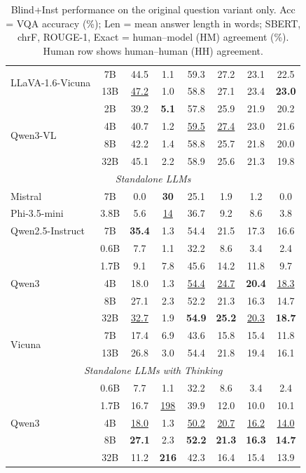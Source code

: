 \begin{table}[t]
{\begin{tabular}{lc|cccccc}
\multirow{2}{*}{LLaVA-1.6-Vicuna} & 7B & 44.5 & 1.1 & 59.3 & 27.2 & 23.1 & 22.5 \\
 & 13B & \underline{47.2} & 1.0 & 58.8 & 27.1 & 23.4 & \textbf{23.0} \\
\multirow{4}{*}{Qwen3-VL} & 2B & 39.2 & \textbf{5.1} & 57.8 & 25.9 & 21.9 & 20.2 \\
 & 4B & 40.7 & 1.2 & \underline{59.5} & \underline{27.4} & 23.0 & 21.6 \\
 & 8B & 42.2 & 1.4 & 58.8 & 25.7 & 21.8 & 20.0 \\
 & 32B & 45.1 & 2.2 & 58.9 & 25.6 & 21.3 & 19.8 \\
\midrule
\multicolumn{8}{c}{\textit{Standalone LLMs}} \\
\midrule
Mistral & 7B & 0.0 & \textbf{30} & 25.1 & 1.9 & 1.2 & 0.0 \\
Phi-3.5-mini & 3.8B & 5.6 & \underline{14} & 36.7 & 9.2 & 8.6 & 3.8 \\
Qwen2.5-Instruct & 7B & \textbf{35.4} & 1.3 & 54.4 & 21.5 & 17.3 & 16.6 \\
\multirow{5}{*}{Qwen3} & 0.6B & 7.7 & 1.1 & 32.2 & 8.6 & 3.4 & 2.4 \\
 & 1.7B & 9.1 & 7.8 & 45.6 & 14.2 & 11.8 & 9.7 \\
 & 4B & 18.0 & 1.3 & \underline{54.4} & \underline{24.7} & \textbf{20.4} & \underline{18.3} \\
 & 8B & 27.1 & 2.3 & 52.2 & 21.3 & 16.3 & 14.7 \\
 & 32B & \underline{32.7} & 1.9 & \textbf{54.9} & \textbf{25.2} & \underline{20.3} & \textbf{18.7} \\
\multirow{2}{*}{Vicuna} & 7B & 17.4 & 6.9 & 43.6 & 15.8 & 15.4 & 11.8 \\
 & 13B & 26.8 & 3.0 & 54.4 & 21.8 & 19.4 & 16.1 \\
\midrule
\multicolumn{8}{c}{\textit{Standalone LLMs with Thinking}} \\
\midrule
\multirow{5}{*}{Qwen3} & 0.6B & 7.7 & 1.1 & 32.2 & 8.6 & 3.4 & 2.4 \\
 & 1.7B & 16.7 & \underline{198} & 39.9 & 12.0 & 10.0 & 10.1 \\
 & 4B & \underline{18.0} & 1.3 & \underline{50.2} & \underline{20.7} & \underline{16.2} & \underline{14.0} \\
 & 8B & \textbf{27.1} & 2.3 & \textbf{52.2} & \textbf{21.3} & \textbf{16.3} & \textbf{14.7} \\
 & 32B & 11.2 & \textbf{216} & 42.3 & 16.4 & 15.4 & 13.9 \\
\bottomrule
\end{tabular}
}
\caption{\small Blind+Inst performance on the original question variant only. Acc = VQA accuracy (\%); Len = mean answer length in words; SBERT, chrF, ROUGE-1, Exact = human--model (HM) agreement (\%). Human row shows human--human (HH) agreement.}
\label{tab:comprehensive_inst_blind_vc}
\end{table}
